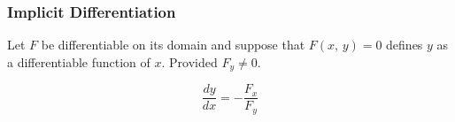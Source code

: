 \subsubsection{Implicit Differentiation}
Let $F$ be differentiable on its domain and suppose that $F(x,\, y) = 0$ defines $y$ as a differentiable function of $x$. Provided $F_y \neq 0$.

\begin{equation}
    \frac{dy}{dx} = - \frac{F_x}{F_y}
\end{equation}
